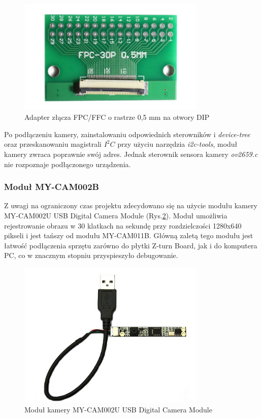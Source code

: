 \begin{figure}[!h]
  \centering
  \includegraphics[width=0.8\textwidth]{img/dvp-adapter.jpg}
  \caption{Adapter złącza FPC/FFC o rastrze 0,5 mm na otwory DIP}
  \label{cam-schematic}
\end{figure}


Po podłączeniu kamery, zainstalowaniu odpowiednich sterowników i \emph{device-tree} oraz przeskanowaniu magistrali $I^2C$ przy użyciu narzędzia \emph{i2c-tools}, moduł kamery zwraca poprawnie swój adres. Jednak sterownik sensora kamery \emph{ov2659.c} nie rozpoznaje podłączonego urządzenia. 

\subsubsection{Moduł MY-CAM002B}

Z uwagi na ograniczony czas projektu zdecydowano się na użycie modułu kamery MY-CAM002U USB Digital Camera Module (Rys.\ref{cam-usb}). Moduł umożliwia rejestrowanie obrazu w 30 klatkach na sekundę przy rozdzielczości 1280x640 pikseli i jest tańszy od modułu MY-CAM011B. Główną zaletą tego modułu jest łatwość podłączenia sprzętu zarówno do płytki Z-turn Board, jak i do komputera PC, co w znacznym stopniu przyspieszyło debugowanie. 

\begin{figure}[!h]
  \centering
  \includegraphics[width=0.8\textwidth]{img/MY-CAM001U.jpg}
  \caption{Moduł kamery MY-CAM002U USB Digital Camera Module}
  \label{cam-usb}
\end{figure}

